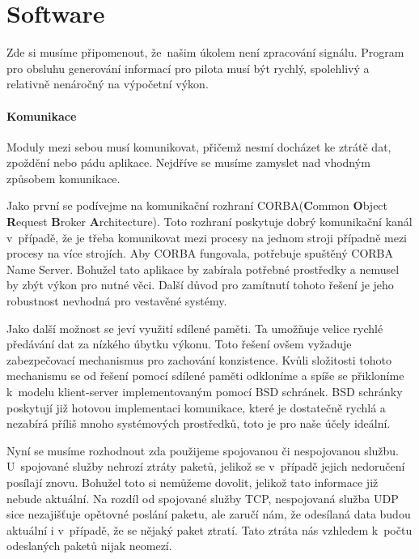 	\section{Software}\label{navrhReseni::software}
		Zde si musíme připomenout, že~našim úkolem není zpracování signálu. Program pro obsluhu generování informací pro pilota musí být rychlý, spolehlivý a relativně nenáročný na výpočetní výkon.
		
		\paragraph{Komunikace}
		Moduly mezi sebou musí komunikovat, přičemž nesmí docházet ke ztrátě dat, zpoždění nebo pádu aplikace. Nejdříve se musíme zamyslet nad vhodným způsobem komunikace.\par 
		Jako první se podívejme na komunikační rozhraní CORBA(\textbf{C}ommon \textbf{O}bject \textbf{R}equest \textbf{B}roker \textbf{A}rchitecture). Toto rozhraní poskytuje dobrý komunikační kanál v~případě, že je třeba komunikovat mezi procesy na jednom stroji případně mezi procesy na více strojích. Aby CORBA fungovala, potřebuje spuštěný CORBA Name Server. Bohužel tato aplikace by zabírala potřebné prostředky a nemusel by zbýt výkon pro nutné věci. Další důvod pro zamítnutí tohoto řešení je jeho robustnost nevhodná pro vestavěné systémy.\par
		Jako další možnost se jeví využití sdílené paměti. Ta umožňuje velice rychlé předávání dat za nízkého úbytku výkonu. Toto řešení ovšem vyžaduje zabezpečovací mechanismus pro zachování konzistence. Kvůli složitosti tohoto mechanismu se od řešení pomocí sdílené paměti odkloníme a spíše se přikloníme k~modelu klient-server implementovaným pomocí BSD schránek. BSD schránky poskytují již hotovou implementaci komunikace, které je dostatečně rychlá a nezabírá příliš mnoho systémových prostředků, toto je pro naše účely ideální.\par
		Nyní se musíme rozhodnout zda použijeme spojovanou či nespojovanou službu. U~spojované služby nehrozí ztráty paketů, jelikož se v~případě jejich nedoručení posílají znovu. Bohužel toto si nemůžeme dovolit, jelikož tato informace již nebude aktuální. Na rozdíl od spojované služby TCP, nespojovaná služba UDP sice nezajišťuje opětovné poslání paketu, ale zaručí nám, že odesílaná data budou aktuální i v~případě, že se nějaký paket ztratí. Tato ztráta nás vzhledem k~počtu odeslaných paketů nijak neomezí. 

